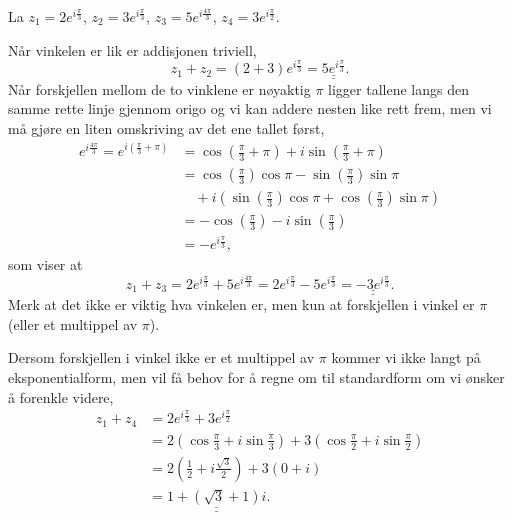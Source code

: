 \documentclass[a4paper,norsk,12pt]{article}
\newcommand{\ans}[1]{\underline{\underline{#1}}}
\newcounter{exa}
\begin{document}
\begin{texample}
	La $z_1 = 2 e^{i\frac{\pi}{3}}$, $z_2 = 3e^{i\frac{\pi}{3}}$, $z_3 = 5e^{i\frac{4\pi}{3}}$, $z_4 = 3e^{i\frac{\pi}{2}}$.

	Når vinkelen er lik er addisjonen triviell,
	\begin{displaymath}
		z_1 + z_2 = (2 + 3) e^{i\frac{\pi}{3}} = \ans{5e^{i\frac{\pi}{3}}}.
	\end{displaymath}
	Når forskjellen mellom de to vinklene er nøyaktig $\pi$ ligger tallene langs den samme rette linje gjennom origo og vi kan addere nesten like rett frem, men vi må gjøre en liten omskriving av det ene tallet først,
	\begin{align*}
	e^{i\frac{4\pi}{3}} = e^{i\left(\frac{\pi}{3}+\pi\right)} &= \cos\left(\frac{\pi}{3}+\pi\right) + i\sin\left(\frac{\pi}{3}+\pi\right)\\
	&= \cos\left(\frac{\pi}{3}\right)\cos\pi - \sin\left(\frac{\pi}{3}\right)\sin\pi \\
	&\quad+ i\left(\sin\left(\frac{\pi}{3}\right)\cos\pi + \cos\left(\frac{\pi}{3}\right)\sin\pi\right) \\
	&= -\cos\left(\frac{\pi}{3}\right)-i\sin\left(\frac{\pi}{3}\right) \\
	&= -e^{i\frac{\pi}{3}},
	\end{align*}
	som viser at 
	\begin{displaymath}
		z_1 + z_3 = 2e^{i\frac{\pi}{3}} + 5e^{i\frac{4\pi}{3}} = 2e^{i\frac{\pi}{3}} - 5e^{i\frac{\pi}{3}} = \ans{-3e^{i\frac{\pi}{3}}}.
	\end{displaymath}
	Merk at det ikke er viktig hva vinkelen er, men kun at forskjellen i vinkel er $\pi$ (eller et multippel av $\pi$).

	Dersom forskjellen i vinkel ikke er et multippel av $\pi$ kommer vi ikke langt på eksponentialform, men vil få behov for å regne om til standardform om vi ønsker å forenkle videre,
	\begin{align*}
		z_1 + z_4 &= 2 e^{i\frac{\pi}{3}} + 3e^{i\frac{\pi}{2}} \\
		&= 2\left(\cos\frac{\pi}{3}+i\sin\frac{\pi}{3}\right) + 3\left(\cos\frac{\pi}{2}+i\sin\frac{\pi}{2}\right) \\
		&= 2\left(\frac12+i\frac{\sqrt{3}}{2}\right) + 3\left(0 + i\right) \\
		&= \ans{1 +\left(\sqrt{3}+1\right)i}.
	\end{align*}
\end{texample}
\end{document}
